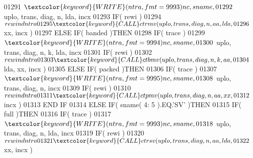 \begin{DoxyCode}
01291      $                           \textcolor{keyword}{WRITE}( ntra, fmt = 9993 )nc, sname,
01292      $                           uplo, trans, diag, n, lda, incx
01293                               \textcolor{keywordflow}{IF}( rewi )
01294      $                           rewind ntra
01295                               \textcolor{keyword}{CALL }ctrmv( uplo, trans, diag, n, aa, lda,
01296      $                                    xx, incx )
01297                            \textcolor{keywordflow}{ELSE} \textcolor{keywordflow}{IF}( banded )\textcolor{keywordflow}{THEN}
01298                               \textcolor{keywordflow}{IF}( trace )
01299      $                           \textcolor{keyword}{WRITE}( ntra, fmt = 9994 )nc, sname,
01300      $                           uplo, trans, diag, n, k, lda, incx
01301                               \textcolor{keywordflow}{IF}( rewi )
01302      $                           rewind ntra
01303                               \textcolor{keyword}{CALL }ctbmv( uplo, trans, diag, n, k, aa,
01304      $                                    lda, xx, incx )
01305                            \textcolor{keywordflow}{ELSE} \textcolor{keywordflow}{IF}( packed )\textcolor{keywordflow}{THEN}
01306                               \textcolor{keywordflow}{IF}( trace )
01307      $                           \textcolor{keyword}{WRITE}( ntra, fmt = 9995 )nc, sname,
01308      $                           uplo, trans, diag, n, incx
01309                               \textcolor{keywordflow}{IF}( rewi )
01310      $                           rewind ntra
01311                               \textcolor{keyword}{CALL }ctpmv( uplo, trans, diag, n, aa, xx,
01312      $                                    incx )
01313 \textcolor{keywordflow}{                           END IF}
01314                         \textcolor{keywordflow}{ELSE} \textcolor{keywordflow}{IF}( sname( 4: 5 ).EQ.\textcolor{stringliteral}{'SV'} )\textcolor{keywordflow}{THEN}
01315                            \textcolor{keywordflow}{IF}( full )\textcolor{keywordflow}{THEN}
01316                               \textcolor{keywordflow}{IF}( trace )
01317      $                           \textcolor{keyword}{WRITE}( ntra, fmt = 9993 )nc, sname,
01318      $                           uplo, trans, diag, n, lda, incx
01319                               \textcolor{keywordflow}{IF}( rewi )
01320      $                           rewind ntra
01321                               \textcolor{keyword}{CALL }ctrsv( uplo, trans, diag, n, aa, lda,
01322      $                                    xx, incx )

\end{DoxyCode}
